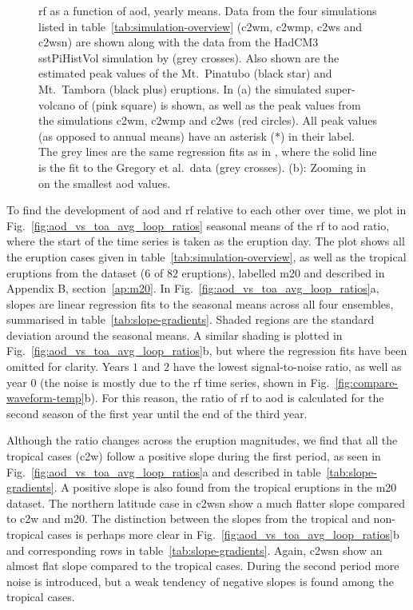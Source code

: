 \documentclass{ametsocV6.1}
\begin{document}
\begin{figure}
  \caption{\gls{rf} as a function of \gls{aod}, yearly means. Data from the four
    simulations listed in table~\ref{tab:simulation-overview} (\gls{c2wm}, \gls{c2wmp},
    \gls{c2ws} and \gls{c2wsn}) are shown along with the data from the HadCM3 sstPiHistVol
    simulation by \citet{gregory2016} (grey crosses). Also shown are the estimated peak
    values of the Mt.\ Pinatubo (black star) and Mt.\ Tambora (black plus) eruptions. In (a)
    the simulated super-volcano of \citet{jones2005} (pink square) is shown, as well as the
    peak values from the simulations \gls{c2wm}, \gls{c2wmp} and \gls{c2ws} (red circles).
    All peak values (as opposed to annual means) have an asterisk (\(\ast{}\)) in their
    label. The grey lines are the same regression fits as in \citet[][Fig.\ 4]{gregory2016},
    where the solid line is the fit to the Gregory et al.\ data (grey crosses). (b): Zooming
    in on the smallest \gls{aod} values.}\label{fig:aod_vs_toa_ses_avg}%
\end{figure}

To find the development of \gls{aod} and \gls{rf} relative to each other over time, we
plot in Fig.~\ref{fig:aod_vs_toa_avg_loop_ratios} seasonal means of the \gls{rf} to
\gls{aod} ratio, where the start of the time series is taken as the eruption day. The
plot shows all the eruption cases given in table~\ref{tab:simulation-overview}, as well
as the tropical eruptions from the \citet{marshall2020dataset} dataset (\(6\) of \(82\)
eruptions), labelled \gls{m20} and described in Appendix B, section~\ref{ap:m20}. In
Fig.~\ref{fig:aod_vs_toa_avg_loop_ratios}a, slopes are linear regression fits to the
seasonal means across all four ensembles, summarised in table~\ref{tab:slope-gradients}.
Shaded regions are the standard deviation around the seasonal means. A similar shading
is plotted in Fig.~\ref{fig:aod_vs_toa_avg_loop_ratios}b, but where the regression fits
have been omitted for clarity. Years \(1\) and \(2\) have the lowest signal-to-noise
ratio, as well as year \(0\) (the noise is mostly due to the \gls{rf} time series, shown
in Fig.~\ref{fig:compare-waveform-temp}b). For this reason, the ratio of \gls{rf} to
\gls{aod} is calculated for the second season of the first year until the end of the
third year.

Although the ratio changes across the eruption magnitudes, we find that all the tropical
cases (\gls{c2w}) follow a positive slope during the first period, as seen in
Fig.~\ref{fig:aod_vs_toa_avg_loop_ratios}a and described in
table~\ref{tab:slope-gradients}. A positive slope is also found from the tropical
eruptions in the \gls{m20} dataset. The northern latitude case in \gls{c2wsn} show a
much flatter slope compared to \gls{c2w} and \gls{m20}. The distinction between the
slopes from the tropical and non-tropical cases is perhaps more clear in
Fig.~\ref{fig:aod_vs_toa_avg_loop_ratios}b and corresponding rows in
table~\ref{tab:slope-gradients}. Again, \gls{c2wsn} show an almost flat slope compared
to the tropical cases. During the second period more noise is introduced, but a weak
tendency of negative slopes is found among the tropical cases.
\end{document}
